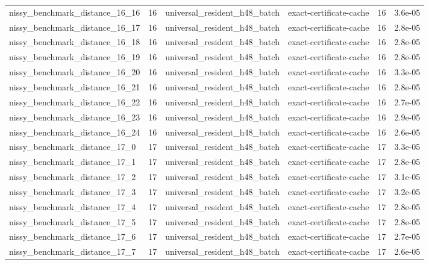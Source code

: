 {\begin{tabular}{lrllrr}
nissy\_benchmark\_distance\_16\_16 & 16 & universal\_resident\_h48\_batch & exact-certificate-cache & 16 & 3.6e-05 \\
nissy\_benchmark\_distance\_16\_17 & 16 & universal\_resident\_h48\_batch & exact-certificate-cache & 16 & 2.8e-05 \\
nissy\_benchmark\_distance\_16\_18 & 16 & universal\_resident\_h48\_batch & exact-certificate-cache & 16 & 2.8e-05 \\
nissy\_benchmark\_distance\_16\_19 & 16 & universal\_resident\_h48\_batch & exact-certificate-cache & 16 & 2.8e-05 \\
nissy\_benchmark\_distance\_16\_20 & 16 & universal\_resident\_h48\_batch & exact-certificate-cache & 16 & 3.3e-05 \\
nissy\_benchmark\_distance\_16\_21 & 16 & universal\_resident\_h48\_batch & exact-certificate-cache & 16 & 2.8e-05 \\
nissy\_benchmark\_distance\_16\_22 & 16 & universal\_resident\_h48\_batch & exact-certificate-cache & 16 & 2.7e-05 \\
nissy\_benchmark\_distance\_16\_23 & 16 & universal\_resident\_h48\_batch & exact-certificate-cache & 16 & 2.9e-05 \\
nissy\_benchmark\_distance\_16\_24 & 16 & universal\_resident\_h48\_batch & exact-certificate-cache & 16 & 2.6e-05 \\
nissy\_benchmark\_distance\_17\_0 & 17 & universal\_resident\_h48\_batch & exact-certificate-cache & 17 & 3.3e-05 \\
nissy\_benchmark\_distance\_17\_1 & 17 & universal\_resident\_h48\_batch & exact-certificate-cache & 17 & 2.8e-05 \\
nissy\_benchmark\_distance\_17\_2 & 17 & universal\_resident\_h48\_batch & exact-certificate-cache & 17 & 3.1e-05 \\
nissy\_benchmark\_distance\_17\_3 & 17 & universal\_resident\_h48\_batch & exact-certificate-cache & 17 & 3.2e-05 \\
nissy\_benchmark\_distance\_17\_4 & 17 & universal\_resident\_h48\_batch & exact-certificate-cache & 17 & 2.8e-05 \\
nissy\_benchmark\_distance\_17\_5 & 17 & universal\_resident\_h48\_batch & exact-certificate-cache & 17 & 2.8e-05 \\
nissy\_benchmark\_distance\_17\_6 & 17 & universal\_resident\_h48\_batch & exact-certificate-cache & 17 & 2.7e-05 \\
nissy\_benchmark\_distance\_17\_7 & 17 & universal\_resident\_h48\_batch & exact-certificate-cache & 17 & 2.6e-05 \\

\end{tabular}}
